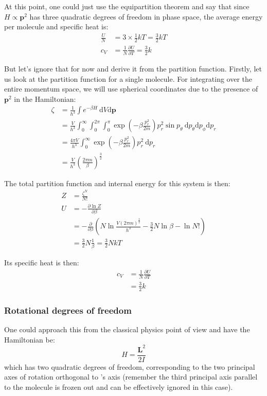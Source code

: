 \documentclass[a4paper]{scrartcl}
\begin{document}
At this point, one could just use the equipartition theorem and say that since \(H \propto \mathbf{p}^2\) has three quadratic degrees of freedom in phase space, the average energy per molecule and specific heat is:
\begin{align*}
    \frac{U}{N} &= 3 \times \frac{1}{2} k T = \frac{3}{2} k T \\
    c_V &= \frac{1}{N} \frac{\partial U}{\partial T} = \frac{3}{2} k
\end{align*}

But let's ignore that for now and derive it from the partition function. Firstly, let us look at the partition function for a single molecule. For integrating over the entire momentum space, we will use spherical coordinates due to the presence of \(\mathbf{p}^2\) in the Hamiltonian:
\begin{align*}
    \zeta &= \frac{1}{h^3} \int e^{-\beta H} \:\mathrm{d} V \mathrm{d} \mathbf{p} \\
    &= \frac{V}{h^3} \int_0^\infty \int_0^{2 \pi} \int_0^\pi \exp\left(-\beta \frac{p_r^2}{2 m}\right) p_r^2 \sin p_\theta \:\mathrm{d} p_\theta \mathrm{d} p_\phi \mathrm{d} p_r \\
    &= \frac{4 \pi V}{h^3} \int_0^\infty \exp\left(-\beta \frac{p_r^2}{2 m}\right) p_r^2 \:\mathrm{d} p_r \\
    &= \frac{V}{h^3} \left(\frac{2 \pi m}{\beta}\right)^{\frac{3}{2}}
\end{align*}

The total partition function and internal energy for this system is then:
\begin{align*}
    Z &= \frac{\zeta^N}{N!} \\
    U &= -\frac{\partial \ln Z}{\partial \beta} \\
    &= -\frac{\partial}{\partial \beta} \left(N \ln \frac{V (2 \pi m)^\frac{3}{2}}{h^3} - \frac{3}{2} N \ln \beta - \ln N!\right) \\
    &= \frac{3}{2} N \frac{1}{\beta} = \frac{3}{2} N k T
\end{align*}

Its specific heat is then:
\begin{align*}
    c_V &= \frac{1}{N} \frac{\partial U}{\partial T} \\
    &= \frac{3}{2} k
\end{align*}

\subsubsection{Rotational degrees of freedom}
One could approach this from the classical physics point of view and have the Hamiltonian be:
\[H = \frac{\mathbf{L}^2}{2 I}\]
which has two quadratic degrees of freedom, corresponding to the two principal axes of rotation orthogonal to 's axis (remember the third principal axis parallel to the molecule is frozen out and can be effectively ignored in this case).
\end{document}
